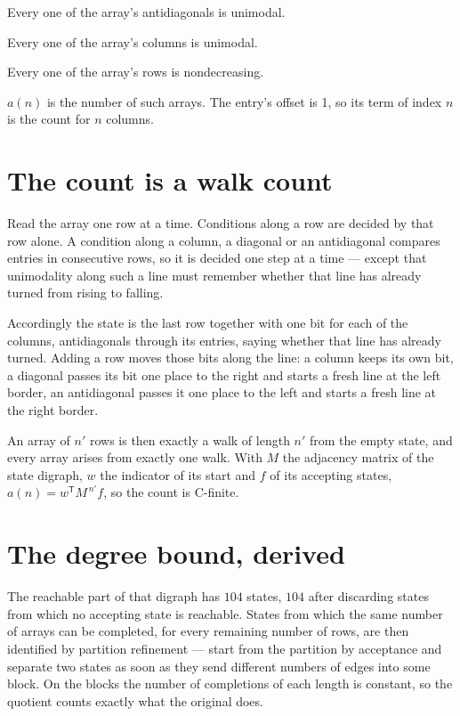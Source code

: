\documentclass[11pt]{article}
\theoremstyle{definition}
\begin{document}
Every one of the array's antidiagonals is unimodal.

Every one of the array's columns is unimodal.

Every one of the array's rows is nondecreasing.

$a(n)$ is the number of such arrays. The entry's offset is 1, so its term of index $n$ is the count for $n$ columns.

\section{The count is a walk count}

Read the array one row at a time. Conditions along a row are decided by that row alone. A condition along a column, a diagonal or an antidiagonal compares entries in consecutive rows, so it is decided one step at a time --- except that unimodality along such a line must remember whether that line has already turned from rising to falling.

Accordingly the state is the last row together with one bit for each of the columns, antidiagonals through its entries, saying whether that line has already turned. Adding a row moves those bits along the line: a column keeps its own bit, a diagonal passes its bit one place to the right and starts a fresh line at the left border, an antidiagonal passes it one place to the left and starts a fresh line at the right border.

An array of $n'$ rows is then exactly a walk of length $n'$ from the empty state, and every array arises from exactly one walk. With $M$ the adjacency matrix of the state digraph, $w$ the indicator of its start and $f$ of its accepting states, $a(n) = w^{\mathsf T}M^{\,n'}f$, so the count is C-finite.

\section{The degree bound, derived}

The reachable part of that digraph has $104$ states, $104$ after discarding states from which no accepting state is reachable. States from which the same number of arrays can be completed, for every remaining number of rows, are then identified by partition refinement --- start from the partition by acceptance and separate two states as soon as they send different numbers of edges into some block. On the blocks the number of completions of each length is constant, so the quotient counts exactly what the original does.
\end{document}
